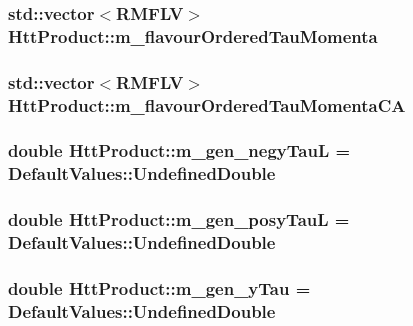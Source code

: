 \hypertarget{classHttProduct_a1927121e20f6b91f82993722074198c0}{
\subsubsection[{m\_\-flavourOrderedTauMomenta}]{\setlength{\rightskip}{0pt plus 5cm}std::vector$<$RMFLV$>$ {\bf HttProduct::m\_\-flavourOrderedTauMomenta}}}
\label{classHttProduct_a1927121e20f6b91f82993722074198c0}
\hypertarget{classHttProduct_a052e584fa560589e8b47cff8675827e4}{
\subsubsection[{m\_\-flavourOrderedTauMomentaCA}]{\setlength{\rightskip}{0pt plus 5cm}std::vector$<$RMFLV$>$ {\bf HttProduct::m\_\-flavourOrderedTauMomentaCA}}}
\label{classHttProduct_a052e584fa560589e8b47cff8675827e4}
\hypertarget{classHttProduct_a2513cc424cf38a9c992c6c51d01234b5}{
\subsubsection[{m\_\-gen\_\-negyTauL}]{\setlength{\rightskip}{0pt plus 5cm}double {\bf HttProduct::m\_\-gen\_\-negyTauL} = DefaultValues::UndefinedDouble}}
\label{classHttProduct_a2513cc424cf38a9c992c6c51d01234b5}
\hypertarget{classHttProduct_a4ed4969177d24dcd0ffa92970479cb5f}{
\subsubsection[{m\_\-gen\_\-posyTauL}]{\setlength{\rightskip}{0pt plus 5cm}double {\bf HttProduct::m\_\-gen\_\-posyTauL} = DefaultValues::UndefinedDouble}}
\label{classHttProduct_a4ed4969177d24dcd0ffa92970479cb5f}
\hypertarget{classHttProduct_a0c74881d1d4b145b91ec71d49e18fa63}{
\subsubsection[{m\_\-gen\_\-yTau}]{\setlength{\rightskip}{0pt plus 5cm}double {\bf HttProduct::m\_\-gen\_\-yTau} = DefaultValues::UndefinedDouble}}
